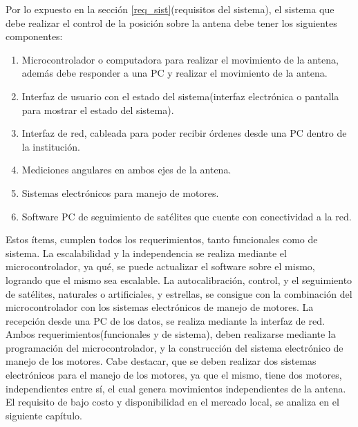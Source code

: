 Por lo expuesto en la sección \ref{req_sist}(requisitos del sistema), el sistema que debe realizar el control de la posición sobre la antena debe tener los siguientes componentes: 

\begin{enumerate}
	\item Microcontrolador o computadora para realizar el movimiento de la antena, además debe responder a una PC y realizar el movimiento de la antena.    
	\item Interfaz de usuario con el estado del sistema(interfaz electrónica o pantalla para mostrar el estado del sistema).
	\item Interfaz de red, cableada para poder recibir órdenes desde una PC dentro de la institución. 
	\item Mediciones angulares en ambos ejes de la antena.  
	\item Sistemas electrónicos para manejo de motores. 
	\item Software PC de seguimiento de satélites que cuente con conectividad a la red.  
\end{enumerate}

Estos ítems, cumplen todos los requerimientos, tanto funcionales como de sistema. La escalabilidad y la independencia se realiza mediante el microcontrolador, ya qué, se puede actualizar el software sobre el mismo, logrando que el mismo sea escalable. La autocalibración, 
control, y el seguimiento de satélites, naturales o artificiales, y estrellas, se consigue con la combinación del microcontrolador con los sistemas electrónicos de manejo de motores. La recepción desde una PC de los datos, se realiza mediante la interfaz de red. Ambos requerimientos(funcionales y de sistema), deben realizarse mediante la programación del microcontrolador, y la construcción del sistema electrónico de manejo de los motores. Cabe destacar, que se deben realizar dos sistemas electrónicos para el manejo de los motores, ya que el mismo, tiene dos motores, independientes entre sí, el cual genera movimientos independientes de la antena. El requisito de bajo costo y disponibilidad en el mercado local, se analiza en el siguiente capítulo. 


